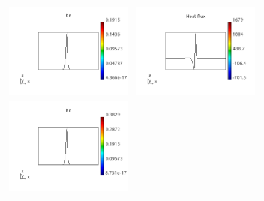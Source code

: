 \documentclass[review]{elsarticle}
\begin{document}
\begin{figure}[tbh]
\begin{center}
\begin{tabular}{cc}
      \includegraphics[width=\psize\textwidth]{figs/Kn_p61D1e8.png} &
      \includegraphics[width=\psize\textwidth]{figs/hflux_p61D1e8.png} \\
      \includegraphics[width=\psize\textwidth]{figs/Kn_p61D5e7.png} &

\end{tabular}
\end{center}
\end{figure}
\end{document}
